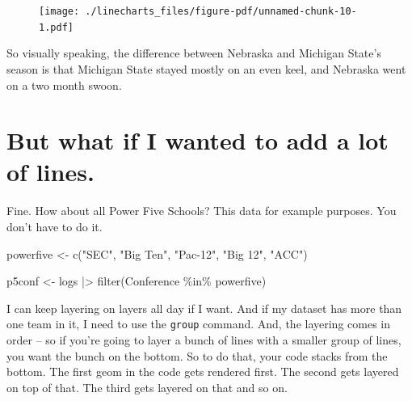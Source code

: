 \documentclass[
  letterpaper,
  DIV=11,
  numbers=noendperiod]{scrreprt}
\newenvironment{Shaded}{\begin{snugshade}}{\end{snugshade}}
\newcommand{\FunctionTok}[1]{\textcolor[rgb]{0.28,0.35,0.67}{#1}}
\newcommand{\NormalTok}[1]{\textcolor[rgb]{0.00,0.23,0.31}{#1}}
\newcommand{\OtherTok}[1]{\textcolor[rgb]{0.00,0.23,0.31}{#1}}
\newcommand{\SpecialCharTok}[1]{\textcolor[rgb]{0.37,0.37,0.37}{#1}}
\newcommand{\StringTok}[1]{\textcolor[rgb]{0.13,0.47,0.30}{#1}}
\begin{document}
\begin{figure}[H]

{\centering \texttt{[image: ./linecharts\_files/figure-pdf/unnamed-chunk-10-1.pdf]}

}

\end{figure}

So visually speaking, the difference between Nebraska and Michigan
State's season is that Michigan State stayed mostly on an even keel, and
Nebraska went on a two month swoon.

\hypertarget{but-what-if-i-wanted-to-add-a-lot-of-lines.}{%
\section{But what if I wanted to add a lot of
lines.}\label{but-what-if-i-wanted-to-add-a-lot-of-lines.}}

Fine. How about all Power Five Schools? This data for example purposes.
You don't have to do it.

\begin{Shaded}
\begin{Highlighting}[]
\NormalTok{powerfive }\OtherTok{\textless{}{-}} \FunctionTok{c}\NormalTok{(}\StringTok{"SEC"}\NormalTok{, }\StringTok{"Big Ten"}\NormalTok{, }\StringTok{"Pac{-}12"}\NormalTok{, }\StringTok{"Big 12"}\NormalTok{, }\StringTok{"ACC"}\NormalTok{)}

\NormalTok{p5conf }\OtherTok{\textless{}{-}}\NormalTok{ logs }\SpecialCharTok{|\textgreater{}} \FunctionTok{filter}\NormalTok{(Conference }\SpecialCharTok{\%in\%}\NormalTok{ powerfive)}
\end{Highlighting}
\end{Shaded}

I can keep layering on layers all day if I want. And if my dataset has
more than one team in it, I need to use the \texttt{group} command. And,
the layering comes in order -- so if you're going to layer a bunch of
lines with a smaller group of lines, you want the bunch on the bottom.
So to do that, your code stacks from the bottom. The first geom in the
code gets rendered first. The second gets layered on top of that. The
third gets layered on that and so on.
\end{document}
